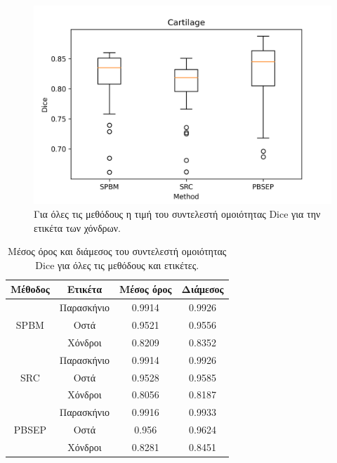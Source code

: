 \documentclass[a4paper,12pt]{article}
\begin{document}
\begin{figure}[H]
    \centering
    \includegraphics[width=0.85\linewidth]{Dice_final_Cartilage_plot.png}
    \caption{Για όλες τις μεθόδους η τιμή του συντελεστή ομοιότητας Dice για την
             ετικέτα των χόνδρων.}
    \label{fig:dice_final:3}
\end{figure}

\begin{table}[h!]
    \centering
    \begin{tabular}{|c|c||c|c|} 
        \hline
        Μέθοδος & Ετικέτα & Μέσος όρος & Διάμεσος \\ 
        \hline
        \hline
        \multirow{3}{4em}{SPBM} & Παρασκήνιο & 0.9914 & 0.9926 \\ 
        & Οστά & 0.9521 & 0.9556 \\ 
        & Χόνδροι & 0.8209 & 0.8352 \\ 
        \hline
        \multirow{3}{4em}{SRC} & Παρασκήνιο & 0.9914 & 0.9926 \\ 
        & Οστά & 0.9528 & 0.9585 \\ 
        & Χόνδροι & 0.8056 & 0.8187 \\ 
        \hline
        \multirow{3}{4em}{PBSEP} & Παρασκήνιο & 0.9916 & 0.9933 \\ 
        & Οστά & 0.956 & 0.9624 \\ 
        & Χόνδροι & 0.8281 & 0.8451 \\ 
        \hline
    \end{tabular}
    \caption{Μέσος όρος και διάμεσος του συντελεστή ομοιότητας Dice για όλες
             τις μεθόδους και ετικέτες.}
    \label{table:final_reuslts:1}
\end{table}
\end{document}
